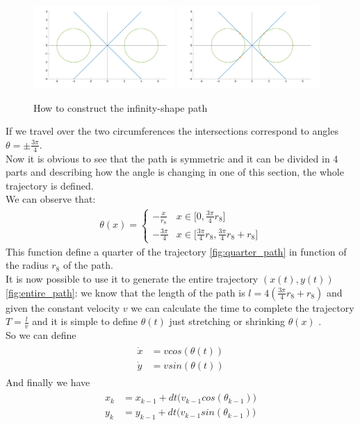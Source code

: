 \begin{figure}[!htbp]
  \centering
 {\includegraphics[width=0.48\textwidth]{img/constructionshape1_.png}\label{fig:constuctinfinity1}}
  \hfill
  {\includegraphics[width=0.48\textwidth]{img/constructionshape2_.png}\label{fig:constuctinfinity2}}
  \caption{How to construct the infinity-shape path}
\end{figure}

If we travel over the two circumferences the intersections correspond to angles $\theta = \pm \frac{3\pi}{4}$. \\
Now it is obvious to see that the path is symmetric and it can be divided in 4 parts and describing how the angle is changing in one of this section, the whole trajectory is defined.\\
We can observe that:
\begin{align}
\theta(x) =
\begin{cases}
    -\frac{x}{r_{8}}  &x\in \Big[0,\frac{3\pi}{4}r_{8}\Big] \quad \quad \ \ \  \\[10pt]
    -\frac{3\pi}{4} &x\in \Big[\frac{3\pi}{4}r_{8} ,\frac{3\pi}{4}r_{8} + r_{8}\Big]
\end{cases}
\end{align}
This function define a quarter of the trajectory \ref{fig:quarter_path} in function of the radius $r_{8}$ of the path.\\
It is now possible to use it to generate the entire trajectory $(x(t),y(t))$\ref{fig:entire_path}: we know that the length of the path is $l = 4(\frac{3\pi}{4}r_{8} + r_{8})$ and given the constant velocity $v$ we can calculate the time to complete the trajectory $T = \frac{l}{v}$ and it is simple to define $\theta(t)$ just stretching or shrinking $\theta(x)$ .\\
So we can define
\begin{align}
\begin{split}
\dot{x} &= v cos(\theta(t)) \\
\dot{y} &= v sin(\theta(t))
\end{split}
\end{align}
And finally we have
\begin{align}
\begin{split}
x_k &= x_{k-1} + dt \big(v_{k-1} cos(\theta_{k-1})\big) \\
y_k &= y_{k-1} + dt \big(v_{k-1} sin(\theta_{k-1})\big)
\end{split}
\end{align}


